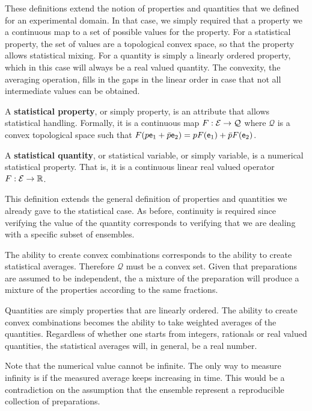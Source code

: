 These definitions extend the notion of properties and quantities that we defined for an experimental domain. In that case, we simply required that a property we a continuous map to a set of possible values for the property. For a statistical property, the set of values are a topological convex space, so that the property allows statistical mixing. For a quantity is simply a linearly ordered property, which in this case will always be a real valued quantity. The convexity, the averaging operation, fills in the gaps in the linear order in case that not all intermediate values can be obtained.

\begin{defn}
	A \textbf{statistical property}, or simply property, is an attribute that allows statistical handling. Formally, it is a continuous map $F : \mathcal{E} \to \mathcal{Q}$ where $\mathcal{Q}$ is a convex topological space such that $F(p \mathsf{e}_1 + \bar{p} \mathsf{e}_2) = p F(\mathsf{e}_1) + \bar{p} F(\mathsf{e}_2)$.
	
	A \textbf{statistical quantity}, or statistical variable, or simply variable, is a numerical statistical property. That is, it is a continuous linear real valued operator $F : \mathcal{E} \to \mathbb{R}$.
\end{defn}

\begin{justification}
	This definition extends the general definition of properties and quantities we already gave to the statistical case. As before, continuity is required since verifying the value of the quantity corresponds to verifying that we are dealing with a specific subset of ensembles.
	
	The ability to create convex combinations corresponds to the ability to create statistical averages. Therefore $\mathcal{Q}$ must be a convex set. Given that preparations are assumed to be independent, the a mixture of the preparation will produce a mixture of the properties according to the same fractions. 
	
	Quantities are simply properties that are linearly ordered. The ability to create convex combinations becomes the ability to take weighted averages of the quantities. Regardless of whether one starts from integers, rationals or real valued quantities, the statistical averages will, in general, be a real number.
	
	Note that the numerical value cannot be infinite. The only way to measure infinity is if the measured average keeps increasing in time. This would be a contradiction on the assumption that the ensemble represent a reproducible collection of preparations.
\end{justification}

